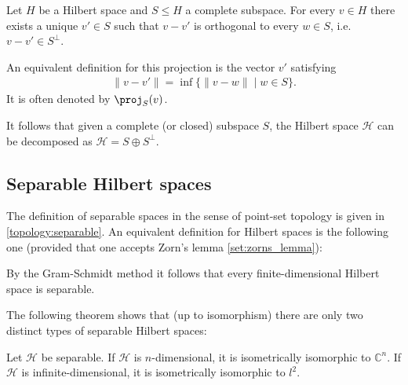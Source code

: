     \begin{theorem}\label{functional:projection_theorem}
        Let $H$ be a Hilbert space and $S\leq H$ a complete subspace. For every $v\in H$ there exists a unique $v'\in S$ such that $v-v'$ is orthogonal to every $w\in S$, i.e.~$v-v'\in S^\perp$.
    \end{theorem}
    \begin{remark}
        An equivalent definition for this projection is the vector $v'$ satisfying
        \begin{gather}
            \|v-v'\| = \inf\{\|v-w\|\mid w\in S\}.
        \end{gather}
        It is often denoted by $\proj_S(v)$.
    \end{remark}
    \begin{result}
        It follows that given a complete (or closed) subspace $S$, the Hilbert space $\mathcal{H}$ can be decomposed as $\mathcal{H}=S\oplus S^\perp$.
    \end{result}


\subsection{Separable Hilbert spaces}

    The definition of separable spaces in the sense of point-set topology is given in \ref{topology:separable}. An equivalent definition for Hilbert spaces is the following one (provided that one accepts Zorn's lemma \ref{set:zorns_lemma}):
    \begin{example}
        By the Gram-Schmidt method it follows that every finite-dimensional Hilbert space is separable.
    \end{example}

    The following theorem shows that (up to isomorphism) there are only two distinct types of separable Hilbert spaces:
    \begin{theorem}
        Let $\mathcal{H}$ be separable. If $\mathcal{H}$ is $n$-dimensional, it is isometrically isomorphic to $\mathbb{C}^n$. If $\mathcal{H}$ is infinite-dimensional, it is isometrically isomorphic to $l^2$.
    \end{theorem}

